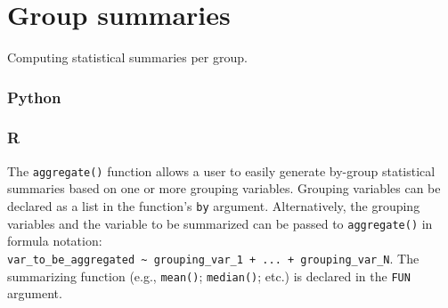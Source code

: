 \documentclass[
]{book}
\newenvironment{Shaded}{\begin{snugshade}}{\end{snugshade}}
\newcommand{\AttributeTok}[1]{\textcolor[rgb]{0.77,0.63,0.00}{#1}}
\newcommand{\DecValTok}[1]{\textcolor[rgb]{0.00,0.00,0.81}{#1}}
\newcommand{\FunctionTok}[1]{\textcolor[rgb]{0.00,0.00,0.00}{#1}}
\newcommand{\NormalTok}[1]{#1}
\newcommand{\SpecialCharTok}[1]{\textcolor[rgb]{0.00,0.00,0.00}{#1}}
\begin{document}
\begin{Shaded}
\end{Shaded}

\hypertarget{group-summaries}{%
\section{Group summaries}\label{group-summaries}}

Computing statistical summaries per group.

\hypertarget{python-36}{%
\subsubsection*{Python}\label{python-36}}

\hypertarget{r-36}{%
\subsubsection*{R}\label{r-36}}

The \texttt{aggregate()} function allows a user to easily generate by-group statistical summaries based on one or more grouping variables. Grouping variables can be declared as a list in the function's \texttt{by} argument. Alternatively, the grouping variables and the variable to be summarized can be passed to \texttt{aggregate()} in formula notation: \texttt{var\_to\_be\_aggregated\ \textasciitilde{}\ grouping\_var\_1\ +\ ...\ +\ grouping\_var\_N}. The summarizing function (e.g., \texttt{mean()}; \texttt{median()}; etc.) is declared in the \texttt{FUN} argument.
\end{document}
